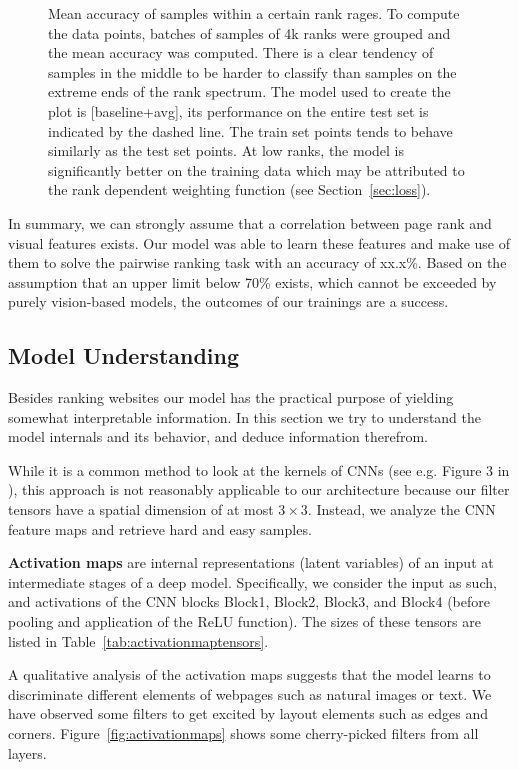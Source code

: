 \begin{figure}
\begin{tikzpicture}
      \end{tikzpicture}
    \caption[Accuracy vs. rank]{Mean accuracy of samples within a certain rank rages. To compute the data points, batches of samples of 4k ranks were grouped and the mean accuracy was computed. There is a clear tendency of samples in the middle to be harder to classify than samples on the extreme ends of the rank spectrum. The model used to create the plot is [baseline+avg], its performance on the entire test set is indicated by the dashed line. The train set points tends to behave similarly as the test set points. At low ranks, the model is significantly better on the training data which may be attributed to the rank dependent weighting function (see Section~\ref{sec:loss}).}
    \label{fig:accvsrank}
\end{figure}

In summary, we can strongly assume that a correlation between page rank and visual features exists. Our model was able to learn these features and make use of them to solve the pairwise ranking task with an accuracy of xx.x\%. Based on the assumption that an upper limit below 70\% exists, which cannot be exceeded by purely vision-based models, the outcomes of our trainings are a success.

\subsection{Model Understanding}

Besides ranking websites our model has the practical purpose of yielding somewhat interpretable information. In this section we try to understand the model internals and its behavior, and deduce information therefrom.

While it is a common method to look at the kernels of CNNs (see e.g. Figure 3 in \cite{krizhevsky:imagenet}), this approach is not reasonably applicable to our architecture because our filter tensors have a spatial dimension of at most $3\times3$. Instead, we analyze the CNN feature maps and retrieve hard and easy samples.

\textbf{Activation maps} are internal representations (latent variables) of an input at intermediate stages of a deep model. Specifically, we consider the input as such, and activations of the CNN blocks Block1, Block2, Block3, and Block4 (before pooling and application of the ReLU function). The sizes of these tensors are listed in Table~\ref{tab:activationmaptensors}.

A qualitative analysis of the activation maps suggests that the model learns to discriminate different elements of webpages such as natural images or text. We have observed some filters to get excited by layout elements such as edges and corners. Figure~\ref{fig:activationmaps} shows some cherry-picked filters from all layers.

